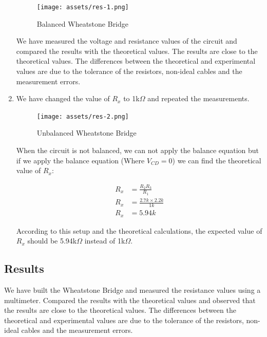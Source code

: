 \begin{enumerate}
    \begin{figure}[h]
        \centering
        \texttt{[image: assets/res-1.png]}
        \caption{Balanced Wheatstone Bridge}
    \end{figure}

    We have measured the voltage and resistance values of the circuit and compared the results with the theoretical values. The results are close to the theoretical values. The differences between the theoretical and experimental values are due to the tolerance of the resistors, non-ideal cables and the measurement errors.

    \newpage
    \thispagestyle{plain}

    \item We have changed the value of $R_x$ to 1k$\Omega$ and repeated the measurements.
    
    \begin{figure}[h]
        \centering
        \texttt{[image: assets/res-2.png]}
        \caption{Unbalanced Wheatstone Bridge}
    \end{figure}

    When the circuit is not balanced, we can not apply the balance equation but if we apply the balance equation (Where $V_{CD} = 0$) we can find the theoretical value of $R_x$:
    
    \begin{align*}
        R_x &= \frac{R_2R_3}{R_1} \\
        R_x &= \frac{2.7k \times 2.2k}{1k} \\
        R_x &= 5.94k
    \end{align*}

    According to this setup and the theoretical calculations, the expected value of $R_x$ should be 5.94k$\Omega$ instead of 1k$\Omega$.
\end{enumerate}

\subsection{Results}

We have built the Wheatstone Bridge and measured the resistance values using a multimeter. Compared the results with the theoretical values and observed that the results are close to the theoretical values. The differences between the theoretical and experimental values are due to the tolerance of the resistors, non-ideal cables and the measurement errors.
